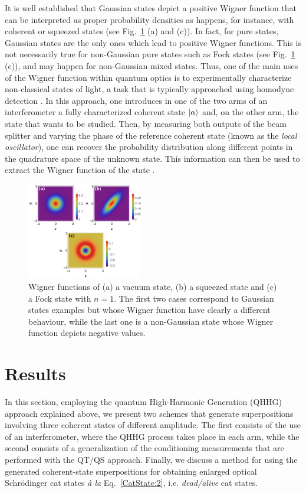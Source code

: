 It is well established that Gaussian states depict a positive Wigner function that can be interpreted as proper probability densities \cite{Hudson1974} as happens, for instance, with coherent or squeezed states (see Fig.~\ref{Fig1} (a) and (c)). In fact, for pure states, Gaussian states are the only ones which lead to positive Wigner functions. This is not necessarily true for non-Gaussian pure states such as Fock states (see Fig.~\ref{Fig1} (c)), and may happen for non-Gaussian mixed states. Thus, one of the main uses of the Wigner function within quantum optics is to experimentally characterize non-classical states of light, a task that is typically approached using homodyne detection \cite{Smithey1993}. In this approach, one introduces in one of the two arms of an interferometer a fully characterized coherent state $\ket{\alpha}$ and, on the other arm, the state that wants to be studied. Then, by measuring both outputs of the beam splitter and varying the phase of the reference coherent state (known as the \emph{local oscillator}), one can recover the probability distribution along different points in the quadrature space of the unknown state. This information can then be used to extract the Wigner function of the state \cite{Smithey1993}.

\begin{figure}
    \centering
    \includegraphics[width =0.45\textwidth]{Fig1.pdf}
    \caption{Wigner functions of (a) a vacuum state, (b) a squeezed state and (c) a Fock state with $n=1$. The first two cases correspond to Gaussian states examples but whose Wigner function have clearly a different behaviour, while the last one is a non-Gaussian state whose Wigner function depicts negative values.}
    \label{Fig1} 
\end{figure}


\section{Results}\label{Results}
In this section, employing the quantum High-Harmonic Generation (QHHG) approach explained above, we present two schemes that generate superpositions involving three coherent states of different amplitude. The first consists of the use of an interferometer, where the QHHG process takes place in each arm, while the second consists of a generalization of the conditioning measurements that are performed with the QT/QS approach. Finally, we discuss a method for using the generated coherent-state superpositions for obtaining enlarged optical Schrödinger cat states \emph{à la} Eq.~\eqref{CatState:2}, i.e. \emph{dead/alive} cat states.

